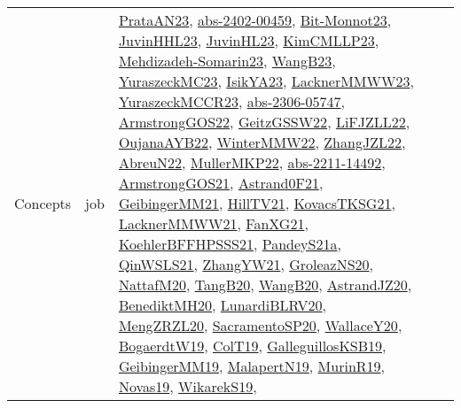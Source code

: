 {\begin{longtable}{llp{6cm}p{6cm}p{6cm}}
Concepts & job & \href{articles/PrataAN23.pdf}{PrataAN23}\cite{PrataAN23}, \href{articles/abs-2402-00459.pdf}{abs-2402-00459}\cite{abs-2402-00459}, \href{papers/Bit-Monnot23.pdf}{Bit-Monnot23}\cite{Bit-Monnot23}, \href{papers/JuvinHHL23.pdf}{JuvinHHL23}\cite{JuvinHHL23}, \href{papers/JuvinHL23.pdf}{JuvinHL23}\cite{JuvinHL23}, \href{papers/KimCMLLP23.pdf}{KimCMLLP23}\cite{KimCMLLP23}, \href{papers/Mehdizadeh-Somarin23.pdf}{Mehdizadeh-Somarin23}\cite{Mehdizadeh-Somarin23}, \href{papers/WangB23.pdf}{WangB23}\cite{WangB23}, \href{papers/YuraszeckMC23.pdf}{YuraszeckMC23}\cite{YuraszeckMC23}, \href{articles/IsikYA23.pdf}{IsikYA23}\cite{IsikYA23}, \href{articles/LacknerMMWW23.pdf}{LacknerMMWW23}\cite{LacknerMMWW23}, \href{articles/YuraszeckMCCR23.pdf}{YuraszeckMCCR23}\cite{YuraszeckMCCR23}, \href{articles/abs-2306-05747.pdf}{abs-2306-05747}\cite{abs-2306-05747}, \href{papers/ArmstrongGOS22.pdf}{ArmstrongGOS22}\cite{ArmstrongGOS22}, \href{papers/GeitzGSSW22.pdf}{GeitzGSSW22}\cite{GeitzGSSW22}, \href{papers/LiFJZLL22.pdf}{LiFJZLL22}\cite{LiFJZLL22}, \href{papers/OujanaAYB22.pdf}{OujanaAYB22}\cite{OujanaAYB22}, \href{papers/WinterMMW22.pdf}{WinterMMW22}\cite{WinterMMW22}, \href{papers/ZhangJZL22.pdf}{ZhangJZL22}\cite{ZhangJZL22}, \href{articles/AbreuN22.pdf}{AbreuN22}\cite{AbreuN22}, \href{articles/MullerMKP22.pdf}{MullerMKP22}\cite{MullerMKP22}, \href{articles/abs-2211-14492.pdf}{abs-2211-14492}\cite{abs-2211-14492}, \href{papers/ArmstrongGOS21.pdf}{ArmstrongGOS21}\cite{ArmstrongGOS21}, \href{papers/Astrand0F21.pdf}{Astrand0F21}\cite{Astrand0F21}, \href{papers/GeibingerMM21.pdf}{GeibingerMM21}\cite{GeibingerMM21}, \href{papers/HillTV21.pdf}{HillTV21}\cite{HillTV21}, \href{papers/KovacsTKSG21.pdf}{KovacsTKSG21}\cite{KovacsTKSG21}, \href{papers/LacknerMMWW21.pdf}{LacknerMMWW21}\cite{LacknerMMWW21}, \href{articles/FanXG21.pdf}{FanXG21}\cite{FanXG21}, \href{articles/KoehlerBFFHPSSS21.pdf}{KoehlerBFFHPSSS21}\cite{KoehlerBFFHPSSS21}, \href{articles/PandeyS21a.pdf}{PandeyS21a}\cite{PandeyS21a}, \href{articles/QinWSLS21.pdf}{QinWSLS21}\cite{QinWSLS21}, \href{articles/ZhangYW21.pdf}{ZhangYW21}\cite{ZhangYW21}, \href{papers/GroleazNS20.pdf}{GroleazNS20}\cite{GroleazNS20}, \href{papers/NattafM20.pdf}{NattafM20}\cite{NattafM20}, \href{papers/TangB20.pdf}{TangB20}\cite{TangB20}, \href{papers/WangB20.pdf}{WangB20}\cite{WangB20}, \href{articles/AstrandJZ20.pdf}{AstrandJZ20}\cite{AstrandJZ20}, \href{articles/BenediktMH20.pdf}{BenediktMH20}\cite{BenediktMH20}, \href{articles/LunardiBLRV20.pdf}{LunardiBLRV20}\cite{LunardiBLRV20}, \href{articles/MengZRZL20.pdf}{MengZRZL20}\cite{MengZRZL20}, \href{articles/SacramentoSP20.pdf}{SacramentoSP20}\cite{SacramentoSP20}, \href{articles/WallaceY20.pdf}{WallaceY20}\cite{WallaceY20}, \href{papers/BogaerdtW19.pdf}{BogaerdtW19}\cite{BogaerdtW19}, \href{papers/ColT19.pdf}{ColT19}\cite{ColT19}, \href{papers/GalleguillosKSB19.pdf}{GalleguillosKSB19}\cite{GalleguillosKSB19}, \href{papers/GeibingerMM19.pdf}{GeibingerMM19}\cite{GeibingerMM19}, \href{papers/MalapertN19.pdf}{MalapertN19}\cite{MalapertN19}, \href{papers/MurinR19.pdf}{MurinR19}\cite{MurinR19}, \href{articles/Novas19.pdf}{Novas19}\cite{Novas19}, \href{articles/WikarekS19.pdf}{WikarekS19}\cite{WikarekS19}, 
\end{longtable}}
